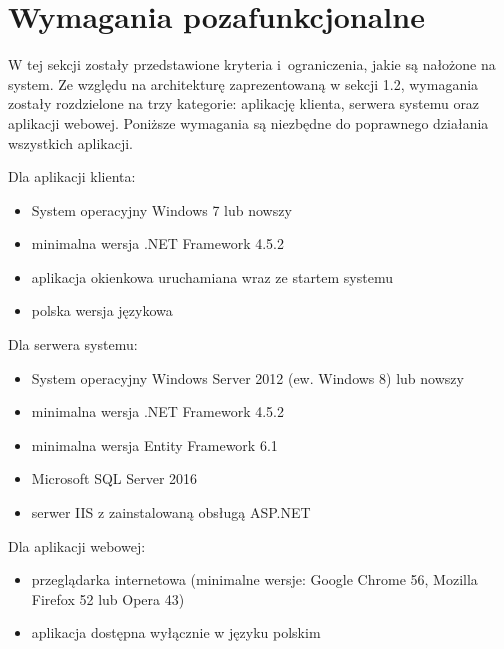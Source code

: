 \section{Wymagania pozafunkcjonalne}
W tej sekcji zostały przedstawione kryteria i~ograniczenia, jakie są nałożone na system. Ze względu na architekturę zaprezentowaną w sekcji 1.2, wymagania zostały rozdzielone na trzy kategorie: aplikację klienta, serwera systemu oraz aplikacji webowej. Poniższe wymagania są niezbędne do poprawnego działania wszystkich aplikacji.

\vspace{1.0cm}

Dla aplikacji klienta:
\begin{itemize}
    \item System operacyjny Windows 7 lub nowszy
    \item minimalna wersja .NET Framework 4.5.2
    \item aplikacja okienkowa uruchamiana wraz ze startem systemu
    \item polska wersja językowa
\end{itemize}

\vspace{0.5cm}

Dla serwera systemu:
\begin{itemize}
    \item System operacyjny Windows Server 2012 (ew. Windows 8) lub nowszy
    \item minimalna wersja .NET Framework 4.5.2
    \item minimalna wersja Entity Framework 6.1
    \item Microsoft SQL Server 2016
    \item serwer IIS z zainstalowaną obsługą ASP.NET
\end{itemize}

\vspace{0.5cm}

Dla aplikacji webowej:
\begin{itemize}
    \item przeglądarka internetowa (minimalne wersje: Google Chrome 56, Mozilla Firefox 52 lub Opera 43)
    \item aplikacja dostępna wyłącznie w języku polskim
\end{itemize}